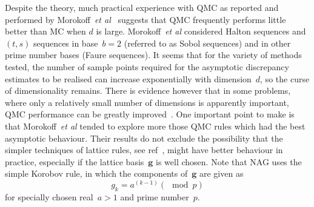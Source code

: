 Despite the theory, much practical experience with QMC
as reported and performed by Morokoff~\emph{et al}~\cite{Mo94Quas,Mo95Quas}
suggests that QMC frequently performs little better than MC
when $d$ is large. Morokoff~\emph{et al} considered Halton sequences
and $(t,s)$ sequences in base~$b=2$ (referred to as Sobol sequences)
and in other prime number bases (Faure sequences).
It seems that for the variety of methods tested,
the number of sample points required for the asymptotic discrepancy
estimates to be realised can increase exponentially with dimension~$d$,
so the curse of dimensionality remains.
There is evidence however that in some problems, where only a relatively small
number of dimensions is apparently important, QMC performance
can be greatly improved~\cite{Ca97Valu}. One important point to make
is that Morokoff~\emph{et al} tended to explore more those QMC
rules which had the best asymptotic behaviour. Their results do not
exclude the possibility that the simpler techniques of
lattice rules, see ref~\cite[\S\,5.1]{niederreiter},
might have better behaviour in
practice, especially if the lattice basis~${\mathbf g}$ is well chosen.
Note that NAG uses the simple Korobov rule, in which the components of~${\mathbf g}$
are given as
\begin{equation}
g_k = a^{(k-1)} (\mod p)
\end{equation}
 for specially chosen real~$a>1$ and prime number~$p$.


